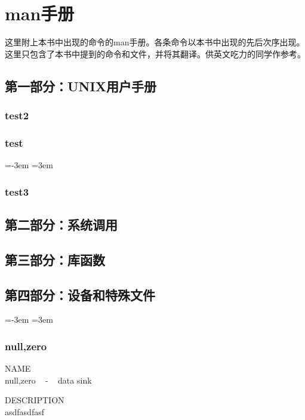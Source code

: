 
\newcommand{\manpage}[1]{
\parindent=0pt
\leftskip=0pt
\subsection{#1}
\parindent=-3.5em
\leftskip=3.5em
}

\chapter{man手册}

这里附上本书中出现的命令的man手册。各条命令以本书中出现的先后次序出现。这里只包含了本书中提到的命令和文件，并将其翻译。供英文吃力的同学作参考。


\section{第一部分：UNIX用户手册}


\subsection{test2}

\subsection{test}

\parindent=-3em
\leftskip=3em

\subsection{test3}

\section{第二部分：系统调用}

\section{第三部分：库函数}

\section{第四部分：设备和特殊文件}

\parindent=-3em
\leftskip=3em

\subsection{null,zero}


NAME \\
	null,zero ~ - ~ data sink

DESCRIPTION\\
asdfasdfasf
